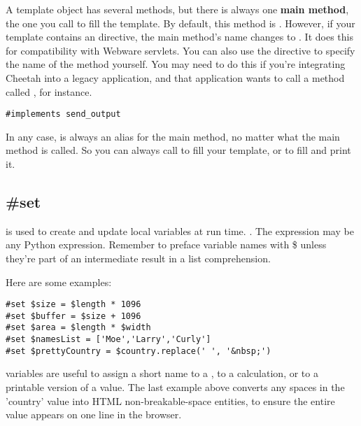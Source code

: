 A template object has several methods, but there is always one {\bf main
method}, the one you call to fill the template.  By default, this method is
.  However, if your template contains an 
directive, the main method's name changes to .  It does
this for compatibility with Webware servlets.  You can also use the
 directive to specify the name of the method yourself.
You may need to do this if you're integrating Cheetah into a legacy
application, and that application wants to call a method called
, for instance.


\begin{verbatim}
#implements send_output
\end{verbatim}

In any case,  is always an alias for the main method, no
matter what the main method is called.  So you can always call  to
fill your template, or  to fill and print it.  



\subsection{\#set}
\label{inheritanceEtc.set}

 is used to create and update local variables at run time.
. The expression may be any Python expression.
Remember to preface variable names with \$ unless they're part of an
intermediate result in a list comprehension.

Here are some examples:
\begin{verbatim}
#set $size = $length * 1096
#set $buffer = $size + 1096
#set $area = $length * $width
#set $namesList = ['Moe','Larry','Curly']
#set $prettyCountry = $country.replace(' ', '&nbsp;')
\end{verbatim}

 variables are useful to assign a short name to a
, to a calculation, or to a printable version of
a value.  The last example above converts any spaces in the 'country' value
into HTML non-breakable-space entities, to ensure the entire value appears on
one line in the browser.

